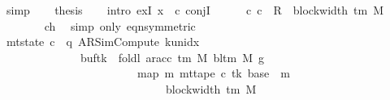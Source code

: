 \begin{isabellebody}
\ simp\isanewline
\ \ \isamarkupfalse%
\ {\isacharquery}{\kern0pt}thesis\isanewline
\ \ \isamarkupfalse%
\ {\isacharparenleft}{\kern0pt}intro\ exI{\isacharbrackleft}{\kern0pt}\ x\ {\isacharequal}{\kern0pt}\ c{}{\isacharbrackright}{\kern0pt}\ conjI{\isacharparenright}{\kern0pt}\isanewline
\ \ \ \ \isamarkupfalse%
\ {\isachardoublequoteopen}{\isacharparenleft}{\kern0pt}c{\isacharprime}{\kern0pt}{\isacharcomma}{\kern0pt}\ c{}{\isacharparenright}{\kern0pt}\ {\isasymin}\ R{\isacharprime}{\kern0pt}\ {\isacharcircum}{\kern0pt}{\isacharcircum}{\kern0pt}\ {\isacharparenleft}{\kern0pt}block{\isacharunderscore}{\kern0pt}width\ {\isacharparenleft}{\kern0pt}{\isasymGamma}{\isacharunderscore}{\kern0pt}tm\ M{\isacharparenright}{\kern0pt}\ {\isacharplus}{\kern0pt}\ {}{\isacharparenright}{\kern0pt}{\isachardoublequoteclose}\isanewline
\ \ \ \ \ \ \isamarkupfalse%
\ ch{}{}\ \isamarkupfalse%
\ {\isacharparenleft}{\kern0pt}simp\ only{\isacharcolon}{\kern0pt}\ eqn{\isacharbrackleft}{\kern0pt}symmetric{\isacharbrackright}{\kern0pt}{\isacharparenright}{\kern0pt}\isanewline
\ \ \ \ \isamarkupfalse%
\ {\isachardoublequoteopen}mt{\isacharunderscore}{\kern0pt}state\ c{}\ {\isacharequal}{\kern0pt}\ {\isacharparenleft}{\kern0pt}q{\isacharcomma}{\kern0pt}\ AR{\isacharunderscore}{\kern0pt}SimCompute{\isacharcomma}{\kern0pt}\ k{\isacharunderscore}{\kern0pt}unidx\ {}{\isacharcomma}{\kern0pt}\ {}{\isacharcomma}{\kern0pt}\isanewline
\ \ \ \ \ \ \ \ \ \ \ \ \ \ buf{\isacharparenleft}{\kern0pt}tk\ {\isacharcolon}{\kern0pt}{\isacharequal}{\kern0pt}\ foldl\ {\isacharparenleft}{\kern0pt}ar{\isacharunderscore}{\kern0pt}acc\ {\isacharparenleft}{\kern0pt}{\isasymGamma}{\isacharunderscore}{\kern0pt}tm\ M{\isacharparenright}{\kern0pt}\ {\isacharparenleft}{\kern0pt}bl{\isacharunderscore}{\kern0pt}tm\ M{\isacharparenright}{\kern0pt}{\isacharparenright}{\kern0pt}\ {\isacharquery}{\kern0pt}g{}\isanewline
\ \ \ \ \ \ \ \ \ \ \ \ \ \ \ \ \ \ \ \ \ \ \ \ {\isacharparenleft}{\kern0pt}map\ {\isacharparenleft}{\kern0pt}{\isasymlambda}m{\isachardot}{\kern0pt}\ mt{\isacharunderscore}{\kern0pt}tape\ c{\isacharprime}{\kern0pt}\ tk\ {\isacharparenleft}{\kern0pt}base\ {\isacharplus}{\kern0pt}\ m{\isacharparenright}{\kern0pt}{\isacharparenright}{\kern0pt}\isanewline
\ \ \ \ \ \ \ \ \ \ \ \ \ \ \ \ \ \ \ \ \ \ \ \ \ \ \ \ \ {\isacharbrackleft}{\kern0pt}{}{\isachardot}{\kern0pt}{\isachardot}{\kern0pt}{\isacharless}{\kern0pt}block{\isacharunderscore}{\kern0pt}width\ {\isacharparenleft}{\kern0pt}{\isasymGamma}{\isacharunderscore}{\kern0pt}tm\ M{\isacharparenright}{\kern0pt}{\isacharbrackright}{\kern0pt}{\isacharparenright}{\kern0pt}{\isacharparenright}{\kern0pt}{\isacharcomma}{\kern0pt}\isanewline

\end{isabellebody}

